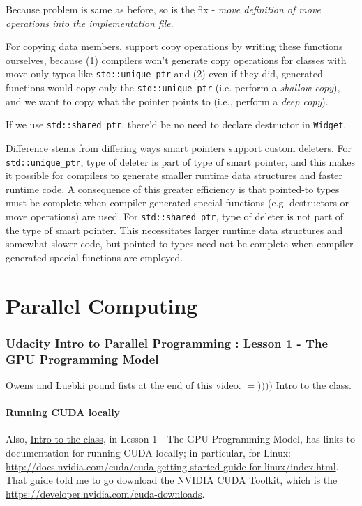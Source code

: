 \documentclass[10pt]{amsart}
\begin{document}
\begin{multicols*}{2}
Because problem is same as before, so is the fix - \emph{move definition of move operations into the implementation file}.  

For copying data members, support copy operations by writing these functions ourselves, because (1) compilers won't generate copy operations for classes with move-only types like \verb|std::unique_ptr| and (2) even if they did, generated functions would copy only the \verb|std::unique_ptr| (i.e. perform a \emph{shallow copy}), and we want to copy what the pointer points to (i.e., perform a \emph{deep copy}).  

If we use \verb|std::shared_ptr|, there'd be no need to declare destructor in \verb|Widget|.  

Difference stems from differing ways smart pointers support custom deleters.  For \verb|std::unique_ptr|, type of deleter is part of type of smart pointer, and this makes it possible for compilers to generate smaller runtime data structures and faster runtime code.  A consequence of this greater efficiency is that pointed-to types must be complete when compiler-generated special functions (e.g. destructors or move operations) are used.  For \verb|std::shared_ptr|, type of deleter is not part of the type of smart pointer.  This necessitates larger runtime data structures and somewhat slower code, but pointed-to types need not be complete when compiler-generated special functions are employed.  




\part{Parallel Computing}


\section{Udacity Intro to Parallel Programming : Lesson 1 - The GPU Programming Model}

Owens and Luebki pound fists at the end of this video.  $=))))$  \href{https://classroom.udacity.com/courses/cs344/lessons/55120467/concepts/658304810923}{Intro to the class}.

\subsection{Running CUDA locally}
Also, \href{https://classroom.udacity.com/courses/cs344/lessons/55120467/concepts/658304810923}{Intro to the class}, in Lesson 1 - The GPU Programming Model, has links to documentation for running CUDA locally; in particular, for Linux: \url{http://docs.nvidia.com/cuda/cuda-getting-started-guide-for-linux/index.html}.  That guide told me to go download the NVIDIA CUDA Toolkit, which is the \href{NVIDIA CUDA Developer Toolkit}{https://developer.nvidia.com/cuda-downloads}.  


\end{multicols*}
\end{document}
